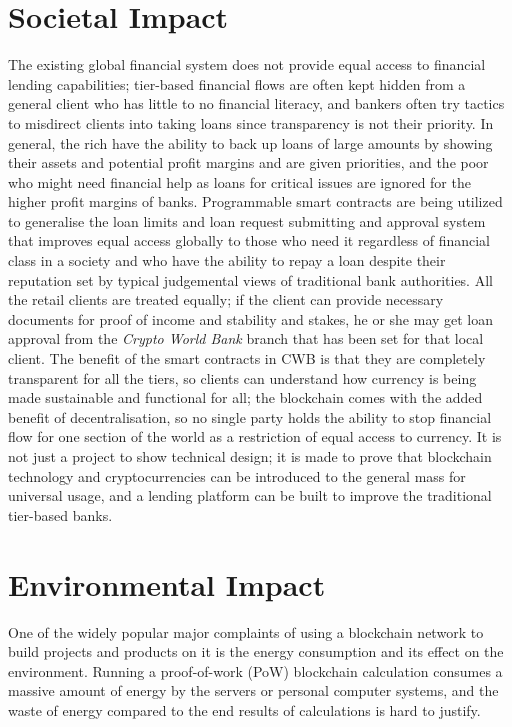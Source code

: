 \section{Societal Impact}
\label{sec:societal-impact}
The existing global financial system does not provide equal access to financial lending capabilities; tier-based financial flows are often kept hidden from a general client who has little to no financial literacy, and bankers often try tactics to misdirect clients into taking loans since transparency is not their priority. In general, the rich have the ability to back up loans of large amounts by showing their assets and potential profit margins and are given priorities, and the poor who might need financial help as loans for critical issues are ignored for the higher profit margins of banks. Programmable smart contracts are being utilized to generalise the loan limits and loan request submitting and approval system that improves equal access globally to those who need it regardless of financial class in a society and who have the ability to repay a loan despite their reputation set by typical judgemental views of traditional bank authorities. All the retail clients are treated equally; if the client can provide necessary documents for proof of income and stability and stakes, he or she may get loan approval from the \textit{Crypto World Bank} branch that has been set for that local client. The benefit of the smart contracts in CWB is that they are completely transparent for all the tiers, so clients can understand how currency is being made sustainable and functional for all; the blockchain comes with the added benefit of decentralisation, so no single party holds the ability to stop financial flow for one section of the world as a restriction of equal access to currency. It is not just a project to show technical design; it is made to prove that blockchain technology and cryptocurrencies can be introduced to the general mass for universal usage, and a lending platform can be built to improve the traditional tier-based banks.

\section{Environmental Impact}
\label{sec:environmental-impact}
One of the widely popular major complaints of using a blockchain network to build projects and products on it is the energy consumption and its effect on the environment. Running a proof-of-work (PoW) blockchain calculation consumes a massive amount of energy by the servers or personal computer systems, and the waste of energy compared to the end results of calculations is hard to justify.

